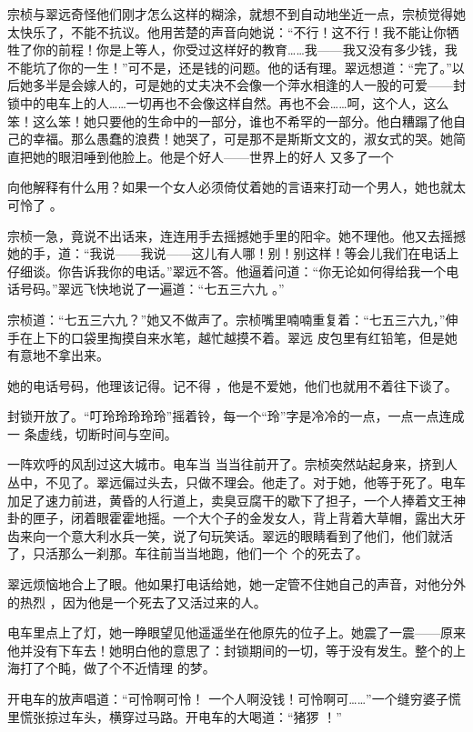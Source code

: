 \documentclass{article}
\begin{document}
    宗桢与翠远奇怪他们刚才怎么这样的糊涂，就想不到自动地坐近一点，宗桢觉得她太快乐了，不能不抗议。他用苦楚的声音向她说：“不行！这不行！我不能让你牺牲了你的前程！你是上等人，你受过这样好的教育……我——我又没有多少钱，我不能坑了你的一生！”可不是，还是钱的问题。他的话有理。翠远想道：“完了。”以后她多半是会嫁人的，可是她的丈夫决不会像一个萍水相逢的人一股的可爱——封锁中的电车上的人……一切再也不会像这样自然。再也不会……呵，这个人，这么笨！这么笨！她只要他的生命中的一部分，谁也不希罕的一部分。他白糟蹋了他自己的幸福。那么愚蠢的浪费！她哭了，可是那不是斯斯文文的，淑女式的哭。她简直把她的眼泪唾到他脸上。他是个好人——世界上的好人
又多了一个 

    向他解释有什么用？如果一个女人必须倚仗着她的言语来打动一个男人，她也就太可怜了
。 

\newpage

    宗桢一急，竟说不出话来，连连用手去摇撼她手里的阳伞。她不理他。他又去摇撼她的手，道：“我说——我说——这儿有人哪！别！别这样！等会儿我们在电话上仔细谈。你告诉我你的电话。”翠远不答。他逼着问道：“你无论如何得给我一个电话号码。”翠远飞快地说了一遍道：“七五三六九
。” 

    宗桢道：“七五三六九？”她又不做声了。宗桢嘴里喃喃重复着：“七五三六九，”伸手在上下的口袋里掏摸自来水笔，越忙越摸不着。翠远
皮包里有红铅笔，但是她有意地不拿出来。 

    她的电话号码，他理该记得。记不得
，他是不爱她，他们也就用不着往下谈了。 

    封锁开放了。“叮玲玲玲玲玲”摇着铃，每一个“玲”字是冷冷的一点，一点一点连成一
条虚线，切断时间与空间。 

    一阵欢呼的风刮过这大城市。电车当
\newpage
当当往前开了。宗桢突然站起身来，挤到人丛中，不见了。翠远偏过头去，只做不理会。他走了。对于她，他等于死了。电车加足了速力前进，黄昏的人行道上，卖臭豆腐干的歇下了担子，一个人捧着文王神卦的匣子，闭着眼霍霍地摇。一个大个子的金发女人，背上背着大草帽，露出大牙齿来向一个意大利水兵一笑，说了句玩笑话。翠远的眼睛看到了他们，他们就活了，只活那么一刹那。车往前当当地跑，他们一个
个的死去了。 

    翠远烦恼地合上了眼。他如果打电话给她，她一定管不住她自己的声音，对他分外的热烈
，因为他是一个死去了又活过来的人。 

    电车里点上了灯，她一睁眼望见他遥遥坐在他原先的位子上。她震了一震——原来他并没有下车去！她明白他的意思了：封锁期间的一切，等于没有发生。整个的上海打了个盹，做了个不近情理
的梦。 

    开电车的放声唱道：“可怜啊可怜！
\newpage
一个人啊没钱！可怜啊可……”一个缝穷婆子慌里慌张掠过车头，横穿过马路。开电车的大喝道：“猪猡
！” 
\end{document}
